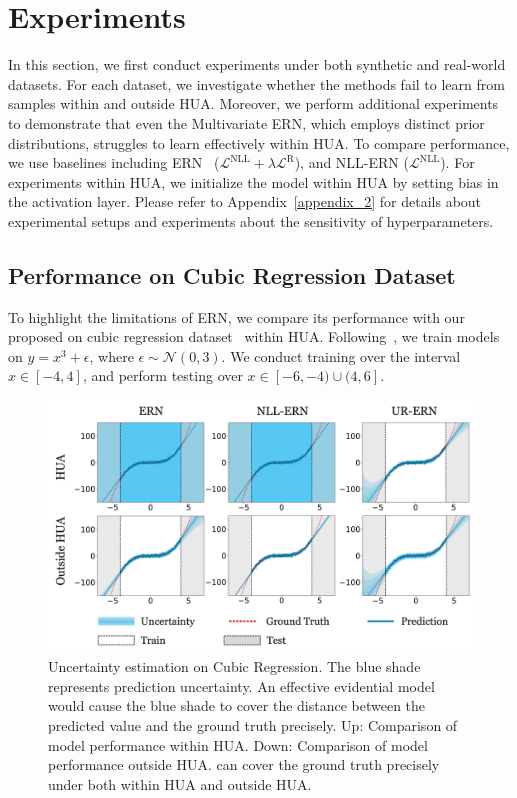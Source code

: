 \section{Experiments}
In this section, we first conduct experiments under both synthetic and real-world datasets. For each dataset, we investigate whether the methods fail to learn from samples within and outside HUA. Moreover, we perform additional experiments to demonstrate that even the Multivariate ERN, which employs distinct prior distributions, struggles to learn effectively within HUA. To compare performance, we use baselines including ERN~\cite{NEURIPS2020_aab08546} ($\mathcal{L}^{\mathrm{NLL}}+\lambda \mathcal{L}^{\mathrm{R}}$), and NLL-ERN ($\mathcal{L}^{\mathrm{NLL}}$). For experiments within HUA, we initialize the model within HUA by setting bias in the activation layer. %
Please refer to Appendix~\ref{appendix_2} for details about experimental setups and experiments about the sensitivity of hyperparameters.


\subsection{Performance on Cubic Regression Dataset}
To highlight the limitations of ERN, we compare its performance with our proposed \ours on cubic regression dataset~\cite{NEURIPS2020_aab08546} within HUA. Following~\cite{NEURIPS2020_aab08546}, we train models on $y=x^3+\epsilon$, where $\epsilon \sim \mathcal{N}(0,3)$. We conduct training over the interval $x \in[-4,4]$, and perform testing over $x \in \left[-6,-4) \cup (4,6\right]$.


\begin{figure}[t!]
\centering
\includegraphics[width=0.9\columnwidth]{toy_dataset.png} %
\caption{Uncertainty estimation on Cubic Regression. The blue shade represents prediction uncertainty. An effective evidential model would cause the blue shade to cover the distance between the predicted value and the ground truth precisely. Up: Comparison of model performance within HUA. Down: Comparison of model performance outside HUA. \ours can cover the ground truth precisely under both within HUA and outside HUA.}
\label{fig:toy_dataset}
\end{figure}

